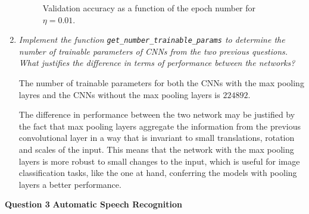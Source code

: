 \documentclass[12pt]{article}
\begin{document}
\begin{enumerate}[leftmargin=\labelsep]
          \begin{figure}[H]
              \centering
              
              \caption{Validation accuracy as a function of the epoch number for $\eta = 0.01$.}
              \label{fig:cnn-validation-accuracy-0.01-0.7-0-sgd-true}
          \end{figure}

    \item \textit{Implement the function \texttt{get\_number\_trainable\_params} to determine the number of trainable parameters of CNNs from the two previous questions. What justifies the difference in terms of performance between the networks?}

          \vspace{12pt}

          The number of trainable parameters for both the CNNs with the max pooling layres and the CNNs without the max pooling layers is $224892$.

          \vspace{12pt}

          The difference in performance between the two network may be justified by the fact that max pooling layers aggregate the information from the previous convolutional layer in a way that is invariant to small translations, rotation and scales of the input. This means that the network with the max pooling layers is more robust to small changes to the input, which is useful for image classification tasks, like the one at hand, conferring the models with pooling layers a better performance.

\end{enumerate}

\center\large{\textbf{Question 3}}
\center\textbf{Automatic Speech Recognition}
\end{document}
